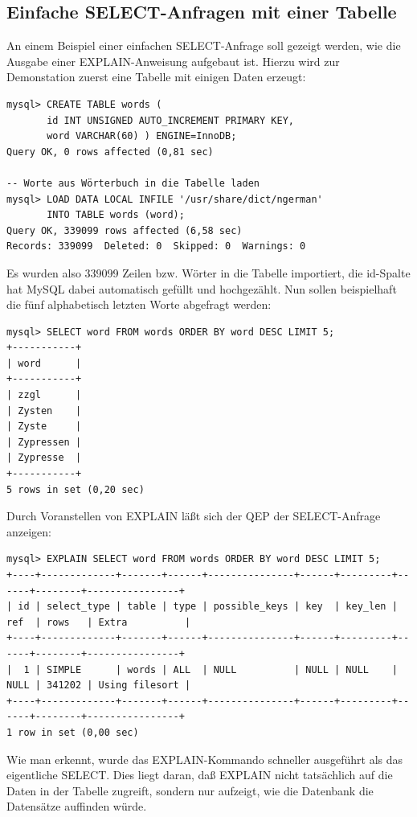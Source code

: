\subsection{Einfache SELECT-Anfragen mit einer Tabelle}
An einem Beispiel einer einfachen SELECT-Anfrage soll gezeigt werden, wie die Ausgabe einer EXPLAIN-Anweisung aufgebaut ist.
Hierzu wird zur Demonstation zuerst eine Tabelle mit einigen Daten erzeugt:
\begin{lstlisting}
mysql> CREATE TABLE words ( 
       id INT UNSIGNED AUTO_INCREMENT PRIMARY KEY, 
       word VARCHAR(60) ) ENGINE=InnoDB; 
Query OK, 0 rows affected (0,81 sec)

-- Worte aus Wörterbuch in die Tabelle laden
mysql> LOAD DATA LOCAL INFILE '/usr/share/dict/ngerman'
       INTO TABLE words (word);
Query OK, 339099 rows affected (6,58 sec)
Records: 339099  Deleted: 0  Skipped: 0  Warnings: 0
\end{lstlisting}
Es wurden also 339099 Zeilen bzw. Wörter in die Tabelle importiert, die id-Spalte hat MySQL dabei automatisch gefüllt und hochgezählt.
Nun sollen beispielhaft die fünf alphabetisch letzten Worte abgefragt werden:\\
\begin{minipage}{\linewidth}
\begin{lstlisting}
mysql> SELECT word FROM words ORDER BY word DESC LIMIT 5;
+-----------+
| word      |
+-----------+
| zzgl      |
| Zysten    |
| Zyste     |
| Zypressen |
| Zypresse  |
+-----------+
5 rows in set (0,20 sec)
\end{lstlisting}
\end{minipage}

Durch Voranstellen von EXPLAIN läßt sich der QEP der SELECT-Anfrage anzeigen:
\begin{lstlisting}[basicstyle=\ttfamily\scriptsize]
mysql> EXPLAIN SELECT word FROM words ORDER BY word DESC LIMIT 5;
+----+-------------+-------+------+---------------+------+---------+------+--------+----------------+
| id | select_type | table | type | possible_keys | key  | key_len | ref  | rows   | Extra          |
+----+-------------+-------+------+---------------+------+---------+------+--------+----------------+
|  1 | SIMPLE      | words | ALL  | NULL          | NULL | NULL    | NULL | 341202 | Using filesort |
+----+-------------+-------+------+---------------+------+---------+------+--------+----------------+
1 row in set (0,00 sec)
\end{lstlisting}
Wie man erkennt, wurde das EXPLAIN-Kommando schneller ausgeführt als das eigentliche SELECT.
Dies liegt daran, daß EXPLAIN nicht tatsächlich auf die Daten in der Tabelle zugreift, sondern nur aufzeigt, wie die Datenbank die Datensätze auffinden würde.


